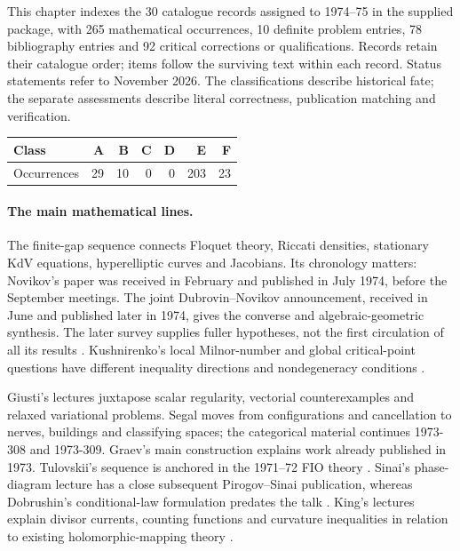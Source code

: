 \noindent
This chapter indexes the 30 catalogue records assigned to 1974--75 in the supplied
package, with 265 mathematical occurrences, 10 definite problem entries,
78 bibliography entries and 92 critical corrections or qualifications.
Records retain their catalogue order; items follow the surviving text within
each record. Status statements refer to November 2026. The classifications
describe historical fate; the separate assessments describe literal correctness,
publication matching and verification.

\begin{center}
\begin{tabular}{@{}lrrrrrr@{}}
\toprule
Class & A & B & C & D & E & F\\
\midrule
Occurrences & 29 & 10 & 0 & 0 & 203 & 23\\
\bottomrule
\end{tabular}
\end{center}

\paragraph{The main mathematical lines.}
The finite-gap sequence connects Floquet theory, Riccati densities, stationary
KdV equations, hyperelliptic curves and Jacobians. Its chronology matters:
Novikov's paper was received in February and published in July 1974, before
the September meetings. The joint Dubrovin--Novikov announcement, received in
June and published later in 1974, gives the converse and algebraic-geometric
synthesis. The later survey supplies fuller hypotheses, not the first
circulation of all its results
\citep{novikov1974periodic,dubrovinnovikov1974periodicity,dubrovinmatveevnovikov1976nonlinear}.
Kushnirenko's local Milnor-number and global critical-point questions have
different inequality directions and nondegeneracy conditions
\citep[Theorems I--II]{kushnirenko1975newton}.

Giusti's lectures juxtapose scalar regularity, vectorial counterexamples and
relaxed variational problems. Segal moves from configurations and cancellation
to nerves, buildings and classifying spaces; the categorical material continues
1973-308 and 1973-309. Graev's main construction explains work already published
in 1973. Tulovskii's sequence is anchored in the 1971--72 FIO theory
\citep{hormander1971fourier,duistermaathormander1972fourierii}.
Sinai's phase-diagram lecture has a close subsequent Pirogov--Sinai publication,
whereas Dobrushin's conditional-law formulation predates the talk
\citep{pirogovsinai1975phase,dobrushin1968conditional}.
King's lectures explain divisor currents, counting functions and curvature
inequalities in relation to existing holomorphic-mapping theory
\citep{griffithsking1973nevanlinna,griffiths1971canonical}.


